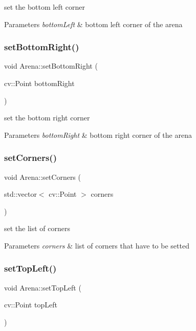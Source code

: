 set the bottom left corner 
\begin{DoxyParams}{Parameters}
{\em bottom\+Left} & bottom left corner of the arena \\
\hline
\end{DoxyParams}
\mbox{\label{class_arena_a2207ae5feab0d9ef8a19ab46fdd8685c}} 
\subsubsection{\texorpdfstring{set\+Bottom\+Right()}{setBottomRight()}}
{\footnotesize\ttfamily void Arena\+::set\+Bottom\+Right (\begin{DoxyParamCaption}\item[{cv\+::\+Point}]{bottom\+Right }\end{DoxyParamCaption})}

set the bottom right corner 
\begin{DoxyParams}{Parameters}
{\em bottom\+Right} & bottom right corner of the arena \\
\hline
\end{DoxyParams}
\mbox{\label{class_arena_a7f822f33ff5810d4d266183e7606c0fe}} 
\subsubsection{\texorpdfstring{set\+Corners()}{setCorners()}}
{\footnotesize\ttfamily void Arena\+::set\+Corners (\begin{DoxyParamCaption}\item[{std\+::vector$<$ cv\+::\+Point $>$}]{corners }\end{DoxyParamCaption})}

set the list of corners 
\begin{DoxyParams}{Parameters}
{\em corners} & list of corners that have to be setted \\
\hline
\end{DoxyParams}
\mbox{\label{class_arena_a7ab570cb7821df75c6da9af6491be034}} 
\subsubsection{\texorpdfstring{set\+Top\+Left()}{setTopLeft()}}
{\footnotesize\ttfamily void Arena\+::set\+Top\+Left (\begin{DoxyParamCaption}\item[{cv\+::\+Point}]{top\+Left }\end{DoxyParamCaption})}

